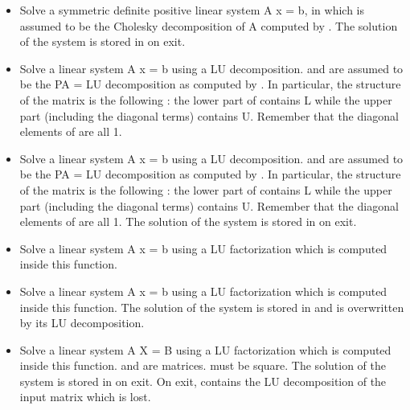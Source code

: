 \begin{itemize}
\item {} 
  \sshortdescribe Solve a symmetric definite positive linear system A x = b, 
  in which  is assumed to be the Cholesky decomposition of A
  computed by . The solution of the system is stored in
   on exit.

\item {} 
  \sshortdescribe Solve a linear system A x = b using a LU decomposition.
   and  are assumed to be the PA = LU decomposition as computed
  by . In particular, the structure of the matrix 
  is the following : the lower part of  contains L while the upper part
  (including the diagonal terms) contains U. Remember that the diagonal
  elements of  are all 1.

\item {} 
  \sshortdescribe Solve a linear system A x = b using a LU decomposition.
   and  are assumed to be the PA = LU decomposition as computed
  by . In particular, the structure of the matrix 
  is the following : the lower part of  contains L while the upper part
  (including the diagonal terms) contains U. Remember that the diagonal
  elements of  are all 1. The solution of the system is stored in 
  on exit.
  
\item {} 
  \sshortdescribe Solve a linear system A x = b using a LU factorization
  which is computed inside this function.

\item {} 
  \sshortdescribe Solve a linear system A x = b using a LU factorization
  which is computed inside this function. The solution of the system is stored
  in  and  is overwritten by its LU decomposition.

\item {} 
  \sshortdescribe Solve a linear system A X = B using a LU factorization
  which is computed inside this function.  and   are
  matrices.  must be square. The solution of the system is stored in
   on exit. On exit,  contains the LU decomposition of the input
  matrix which is lost.


\end{itemize}
